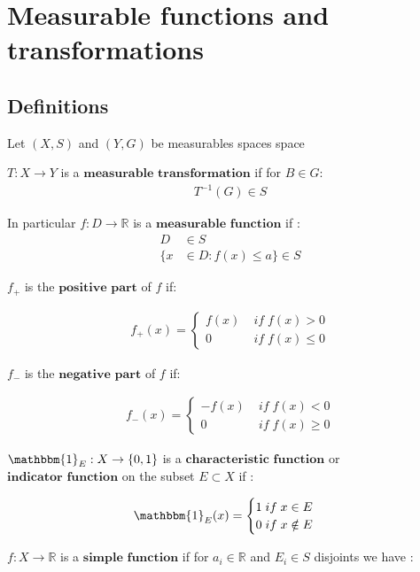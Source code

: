 \section{Measurable functions and transformations}

\subsection{Definitions}
Let $(X,S)$ and $(Y,G)$ be measurables spaces space

$T : X \rightarrow Y$ is a $\textbf{measurable transformation}$ if for $B\in G$: 
\begin{align}
T^{-1}(G) \in S
\end{align}

In particular $f:D \rightarrow \mathbb{R}$ is a $\textbf{measurable function}$ if :
\begin{align}
D &\in S\\
\{x &\in D:f(x) \leq a\} \in S 
\end{align}

$f_+$ is the $\textbf{positive part}$ of $f$ if:

\begin{align}
f_+(x) = 
\begin{cases}
f(x) \;&if \;f(x) > 0\\ 
0 \;&if \;f(x) \leq 0
\end{cases}
\end{align}

$f_-$ is the $\textbf{negative part}$ of $f$ if:

\begin{align}
f_-(x) = 
\begin{cases}
-f(x) \;&if \;f(x) < 0\\ 
0 \;&if \;f(x) \geq 0
\end{cases}
\end{align}



$\mathbbm{1}_E : X \rightarrow \{0,1\}$ is a $\textbf{characteristic function}$ or $\textbf{indicator function}$ on the subset $E \subset X$ if :

\begin{align}
\mathbbm{1}_E(x) = 
\begin{cases}
1 \;if \;x \in E\\ 
0 \;if \;x \notin E
\end{cases}
\end{align}

$f : X \rightarrow \mathbb{R}$ is a $\textbf{simple function}$ if for $a_i \in \mathbb{R}$ and $E_i \in S$ disjoints we have :

